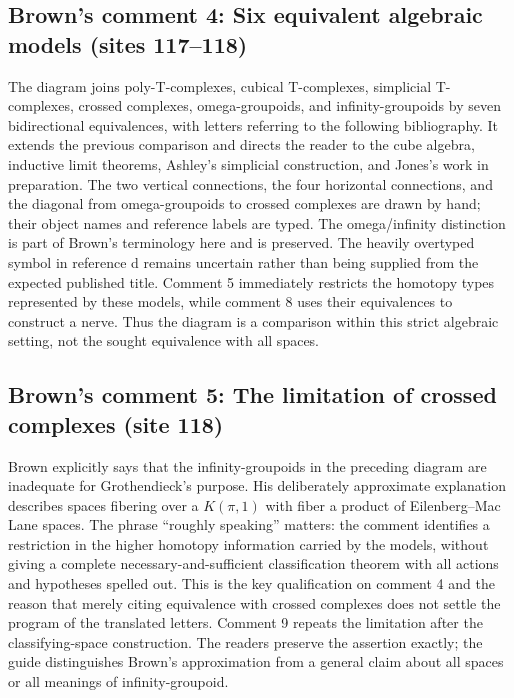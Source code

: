 \documentclass[10pt,oneside]{book}
\begin{document}
\subsection*{Brown's comment 4: Six equivalent algebraic models (sites 117--118)}
The diagram joins poly-T-complexes, cubical T-complexes, simplicial T-complexes, crossed complexes, omega-groupoids, and infinity-groupoids by seven bidirectional equivalences, with letters referring to the following bibliography. It extends the previous comparison and directs the reader to the cube algebra, inductive limit theorems, Ashley's simplicial construction, and Jones's work in preparation. The two vertical connections, the four horizontal connections, and the diagonal from omega-groupoids to crossed complexes are drawn by hand; their object names and reference labels are typed. The omega/infinity distinction is part of Brown's terminology here and is preserved. The heavily overtyped symbol in reference d remains uncertain rather than being supplied from the expected published title. Comment 5 immediately restricts the homotopy types represented by these models, while comment 8 uses their equivalences to construct a nerve. Thus the diagram is a comparison within this strict algebraic setting, not the sought equivalence with all spaces.

\subsection*{Brown's comment 5: The limitation of crossed complexes (site 118)}
Brown explicitly says that the infinity-groupoids in the preceding diagram are inadequate for Grothendieck's purpose. His deliberately approximate explanation describes spaces fibering over a $K(\pi,1)$ with fiber a product of Eilenberg--Mac Lane spaces. The phrase ``roughly speaking'' matters: the comment identifies a restriction in the higher homotopy information carried by the models, without giving a complete necessary-and-sufficient classification theorem with all actions and hypotheses spelled out. This is the key qualification on comment 4 and the reason that merely citing equivalence with crossed complexes does not settle the program of the translated letters. Comment 9 repeats the limitation after the classifying-space construction. The readers preserve the assertion exactly; the guide distinguishes Brown's approximation from a general claim about all spaces or all meanings of infinity-groupoid.
\end{document}
